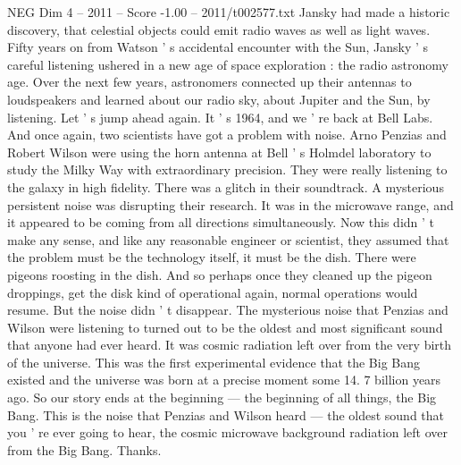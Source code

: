 \begin{textsample}{NEG Dim 4 – 2011 – Score -1.00 – 2011/t002577.txt}
Jansky had made a historic discovery, that celestial objects could emit radio waves as well as light waves.
Fifty years on from Watson ' s accidental encounter with the Sun, Jansky ' s careful listening ushered in a new age of space exploration : the radio astronomy age.
Over the next few years, astronomers connected up their antennas to loudspeakers and learned about our radio sky, about Jupiter and the Sun, by listening.
Let ' s jump ahead again.
It ' s 1964, and we ' re back at Bell Labs.
And once again, two scientists have got a problem with noise.
Arno Penzias and Robert Wilson were using the horn antenna at Bell ' s Holmdel laboratory to study the Milky Way with extraordinary precision.
They were really listening to the galaxy in high fidelity.
There was a glitch in their soundtrack.
A mysterious persistent noise was disrupting their research.
It was in the microwave range, and it appeared to be coming from all directions simultaneously.
Now this didn ' t make any sense, and like any reasonable engineer or scientist, they assumed that the problem must be the technology itself, it must be the dish.
There were pigeons roosting in the dish.
And so perhaps once they cleaned up the pigeon droppings, get the disk kind of operational again, normal operations would resume.
But the noise didn ' t disappear.
The mysterious noise that Penzias and Wilson were listening to turned out to be the oldest and most significant sound that anyone had ever heard.
It was cosmic radiation left over from the very birth of the universe.
This was the first experimental evidence that the Big Bang existed and the universe was born at a precise moment some 14. 7 billion years ago.
So our story ends at the beginning — the beginning of all things, the Big Bang.
This is the noise that Penzias and Wilson heard — the oldest sound that you ' re ever going to hear, the cosmic microwave background radiation left over from the Big Bang.
Thanks.

\end{textsample}
